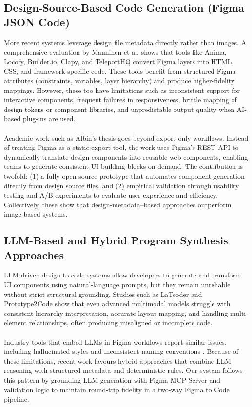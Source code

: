 \subsection{Design-Source-Based Code Generation (Figma JSON Code)}
More recent systems leverage design file metadata directly rather than images. A comprehensive evaluation by Manninen et al. \cite{manninen2024harnessing} shows that tools like Anima, Locofy, Builder.io, Clapy, and TeleportHQ convert Figma layers into HTML, CSS, and framework-specific code. These tools benefit from structured Figma attributes (constraints, variables, layer hierarchy) and produce higher-fidelity mappings. However, these too have limitations such as inconsistent support for interactive components, frequent failures in responsiveness, brittle mapping of design tokens or component libraries, and unpredictable output quality when AI-based plug-ins are used. 
\\\\
Academic work such as Albin's thesis \cite{frick2022design2code} goes beyond export-only workflows. Instead of treating Figma as a static export tool, the work uses Figma's REST API to dynamically translate design components into reusable web components, enabling teams to generate consistent UI building blocks on demand. The contribution is twofold: (1) a fully open-source prototype that automates component generation directly from design source files, and (2) empirical validation through usability testing and A/B experiments to evaluate user experience and efficiency. Collectively, these show that design-metadata–based approaches outperform image-based systems.

\subsection{LLM-Based and Hybrid Program Synthesis Approaches}
LLM-driven design-to-code systems allow developers to generate and transform UI components using natural-language prompts, but they remain unreliable without strict structural grounding. Studies such as LaTcoder \cite{latcoder2025} and Prototype2Code \cite{xiao2024prototype2code} show that even advanced multimodal models struggle with consistent hierarchy interpretation, accurate layout mapping, and handling multi-element relationships, often producing misaligned or incomplete code.
\\\\
Industry tools that embed LLMs in Figma workflows report similar issues, including hallucinated styles and inconsistent naming conventions \cite{manninen2024harnessing}. Because of these limitations, recent work favours hybrid approaches that combine LLM reasoning with structured metadata and deterministic rules. Our system follows this pattern by grounding LLM generation with Figma MCP Server and validation logic to maintain round-trip fidelity in a two-way Figma to Code pipeline.

